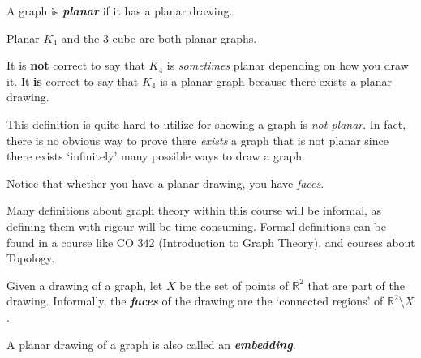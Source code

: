\begin{Definition}{}{}
    A graph is \textbf{\emph{planar}} if it has a planar drawing.
\end{Definition}

\begin{Example}{Planar}{}
    $ K_4 $ and the $ 3 $-cube are both planar graphs.
\end{Example}

It is \textbf{not} correct to say that $ K_4 $ is \emph{sometimes}
planar depending on how you draw it. It \textbf{is} correct to say
that $ K_4 $ is a planar graph because there exists a planar drawing.


This definition is quite hard to utilize for showing a graph is
\emph{not planar}. In fact, there is no obvious way
to prove there \emph{exists} a graph that is not planar since there exists
`infinitely' many possible ways to draw a graph.

Notice that whether you have a planar drawing, you have \emph{faces}.


Many definitions about graph theory within this course will be informal,
as defining them with rigour will be time consuming. Formal definitions
can be found in a course like CO 342 (Introduction to Graph Theory),
and courses about Topology.



\begin{Definition}{}{}
    Given a drawing of a graph,
    let $ X $ be the set of points of $ \mathbb{R}^2 $ that
    are part of the drawing. Informally, the \textbf{\emph{faces}}
    of the drawing are the `connected regions'
    of $ \mathbb{R}^2\setminus X $.
\end{Definition}



A planar drawing of a graph is also called an \textbf{\emph{embedding}}.


